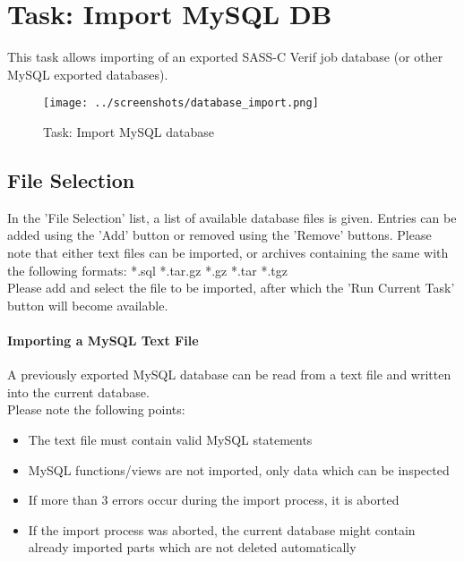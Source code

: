 \section{Task: Import MySQL DB}
\label{sec:task_import_mysql_db}

This task allows importing of an exported SASS-C Verif job database (or other MySQL exported databases).

\begin{figure}[H]
  \hspace*{-2.5cm}
    \texttt{[image: ../screenshots/database\_import.png]}
  \caption{Task: Import MySQL database}
\end{figure}

\subsection{File Selection}

In the 'File Selection' list, a list of available database files is given. Entries can be added using the 'Add' button or removed using the 'Remove' buttons. Please note that either text files can be imported, or archives containing the same with the following formats: *.sql *.tar.gz *.gz *.tar *.tgz \\

Please add and select the file to be imported, after which the 'Run Current Task' button will become available. \\

\paragraph{Importing a MySQL Text File}

A previously exported MySQL database can be read from a text file and written into the current database. \\

Please note the following points:

\begin{itemize}  
\item The text file must contain valid MySQL statements
\item MySQL functions/views are not imported, only data which can be inspected
\item If more than 3 errors occur during the import process, it is aborted
\item If the import process was aborted, the current database might contain already imported parts which are not deleted automatically
\end{itemize}

